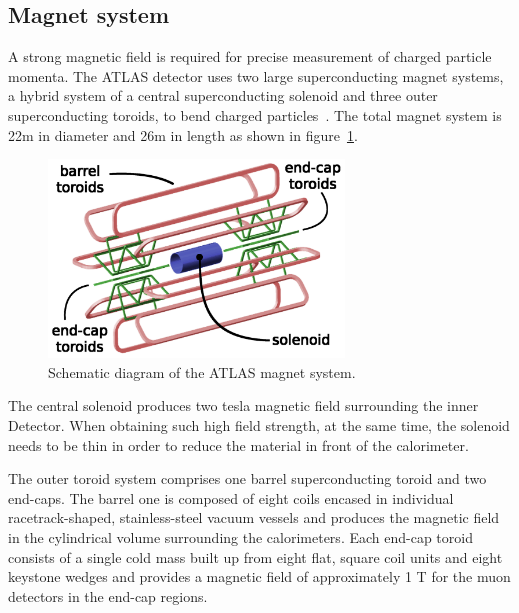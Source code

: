 \subsection{Magnet system}

A strong magnetic field is required for precise measurement of charged particle momenta.
The ATLAS detector uses two large superconducting magnet systems, a hybrid system of a central superconducting solenoid and three outer superconducting toroids, to bend charged particles~\cite{McFayden:phdthesis}.
The total magnet system is 22m in diameter and 26m in length as shown in figure~\ref{fig:megnet_sys}.
\begin{figure}[!htb]
  \centering
  \includegraphics[width=0.7\textwidth]{figures/Detector/magnetSystems.png}
  \caption{Schematic diagram of the ATLAS magnet system.}
  \label{fig:megnet_sys}
\end{figure}

The central solenoid produces two tesla magnetic field surrounding the inner Detector.
When obtaining such high field strength, at the same time, the solenoid needs to be thin in order to reduce the material in front of the calorimeter.

The outer toroid system comprises one barrel superconducting toroid and two end-caps.
The barrel one is composed of eight coils encased in individual racetrack-shaped, stainless-steel vacuum vessels and produces the magnetic field in the cylindrical volume surrounding the calorimeters.
Each end-cap toroid consists of a single cold mass built up from eight flat, square coil units and eight keystone wedges and provides a magnetic field of approximately 1 T for the muon detectors in the end-cap regions.
